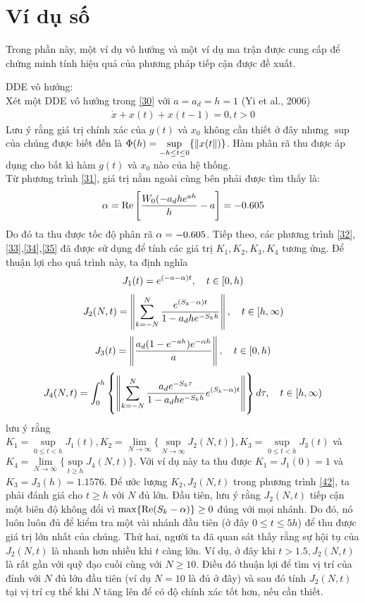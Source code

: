 \section{Ví dụ số}
Trong phần này, một ví dụ vô hướng và một ví dụ ma trận được cung cấp để chứng minh tính hiệu quả của phương pháp tiếp cận được đề xuất.
\begin{vd}
	DDE vô hướng:\\
	Xét một DDE vô hướng trong \eqref{30} với $a = a_d = h =1$ (Yi et al., 2006)
	\begin{align}\label{39}
		\dot{x} +x(t) + x(t-1) = 0, t > 0
	\end{align}
	Lưu ý rằng giá trị chính xác của $g(t)$ và $x_0$ không cần thiết ở đây nhưng $\sup$ của chúng được biết đến là $\Phi(h) = \sup\limits_{-h \le t \le 0} \{\Vert x(t\Vert)\}$. Hàm phân rã thu được áp dụng cho bất kì hàm $g(t)$ và $x_0$ nào của hệ thống.\\
	Từ phương trình \eqref{31}, giá trị nằm ngoài cùng bên phải được tìm thấy là:
	\begin{align}\label{40}
		\alpha = \mathrm{Re} \left[\dfrac{W_0(-a_dhe^{ah}}{h} -a \right] = -0.605
	\end{align}
Do đó ta thu được tốc độ phân rã $\alpha= -0.605$. Tiếp theo, các phương trình \eqref{32}, \eqref{33},\eqref{34},\eqref{35} đã được sử dụng để tính các giá trị $K_1, K_2,K_3,K_4$ tương ứng. Để thuận lợi cho quá trình này, ta định nghĩa
\begin{align}\label{41}
	J_1(t) = e^{(-a-\alpha)t}, \quad t \in [0,h)
\end{align}
%
\begin{align}\label{42}
	J_2(N,t) = \left\Vert \sum_{k=-N}^N \dfrac{e^{(S_k - \alpha)t}}{1-a_dhe^{-S_kh}} \right\Vert, \quad t \in [h,\infty)
\end{align}
%
\begin{align}\label{43}
	J_3(t) = \left \Vert \dfrac{a_d(1-e^{-ah})e^{-\alpha h}}{a}\right \Vert, \quad t \in [0,h)
\end{align}
%
\begin{equation}\label{44}
	J_4(N,t) = \int_0^h \left\{\left\Vert \sum_{k=-N}^N \dfrac{a_de^{-S_k\tau}}{1-a_dhe^{-S_kh}}e^{(S_k-\alpha)t}\right\Vert \right\}d\tau, \quad t \in [h,\infty)
\end{equation}
lưu ý rằng $K_1 = \sup \limits_{0 \le t <h}J_1(t), K_2 = \lim\limits_{N\to\infty} \{\sup\limits_{N\to \infty} J_2(N,t)\}, K_3 = \sup\limits_{0 \le t <h}J_3(t)$ và $K_4 = \lim\limits_{N\to \infty}\{\sup\limits_{t \ge h}J_4(N,t) \}$. Với ví dụ này ta thu được $K_1 = J_1(0)=1$ và $K_3= J_3(h) = 1.1576$. Để ước lượng $K_2, J_2(N,t)$ trong phương trình \eqref{42}, ta phải đánh giá cho $t \ge h$ với $N$ đủ lớn. Đầu tiên, lưu ý rằng $J_2(N,t)$ tiếp cận một biên độ không đổi vì $\max\{ \mathrm{Re}(S_k-\alpha) \} \ge 0$ đúng với mọi nhánh. Do đó, nó luôn luôn đủ để kiểm tra một vài nhánh đầu tiên (ở đây $0 \le t \le 5h$) để thu được giá trị lớn nhất của chúng. Thứ hai, người ta đã quan sát thấy rằng sự hội tụ của $J_2(N,t)$ là nhanh hơn nhiều khi $t$ càng lớn. Ví dụ, ở đây khi $t > 1.5, J_2(N,t)$ là rất gần với quỹ đạo cuối cùng với $ N \ge 10$. Điều đó thuận lợi để tìm vị trí của đỉnh với $N$ đủ lớn đầu tiên (ví dụ $N =10$ là đủ ở đây) và sau đó tính $J_2(N,t)$ tại vị trí cụ thể khi $N$ tăng lên để có độ chính xác tốt hơn, nếu cần thiết.\\

\end{vd}
